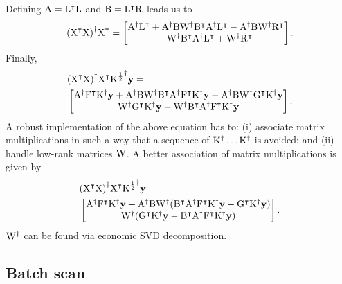 \documentclass[twocolumn,draft]{article}
\begin{document}
	Defining $\mathrm{A} = {\mathrm{L}}^\intercal\mathrm{L}$ and $\mathrm{B} = {\mathrm{L}}^\intercal\mathrm{R}$ leads us to
	\begin{equation*}
			{({\mathrm{X}}^\intercal\mathrm{X})}^{\dagger}{\mathrm{X}}^\intercal =
					\begin{bmatrix}
									{\mathrm{A}}^{\dagger}{\mathrm{L}}^\intercal
												+ {\mathrm{A}}^{\dagger}\mathrm{B}{\mathrm{W}}^{\dagger}{\mathrm{B}}^\intercal{\mathrm{A}}^{\dagger}{\mathrm{L}}^\intercal
															-{\mathrm{A}}^{\dagger}\mathrm{B}{\mathrm{W}}^{\dagger}{\mathrm{R}}^\intercal\\
																		-{\mathrm{W}}^{\dagger}{\mathrm{B}}^\intercal{\mathrm{A}}^{\dagger}{\mathrm{L}}^\intercal
																					+ {\mathrm{W}}^{\dagger}{\mathrm{R}}^\intercal
																							\end{bmatrix}.
	\end{equation*}
	Finally,
	\begin{align*}
			&{({\mathrm{X}}^\intercal\mathrm{X})}^{\dagger}{\mathrm{X}}^\intercal {\mathrm{K}^{\frac{1}{2}}}^{\dagger}\mathbf{y} = \\
				&\begin{bmatrix}
							{\mathrm{A}}^{\dagger}{\mathrm{F}}^\intercal{\mathrm{K}}^{\dagger}\mathbf{y}
									+ {\mathrm{A}}^{\dagger}\mathrm{B}{\mathrm{W}}^{\dagger}{\mathrm{B}}^\intercal{\mathrm{A}}^{\dagger}{\mathrm{F}}^\intercal{\mathrm{K}}^{\dagger}\mathbf{y}
											-{\mathrm{A}}^{\dagger}\mathrm{B}{\mathrm{W}}^{\dagger}{\mathrm{G}}^\intercal{\mathrm{K}}^{\dagger}\mathbf{y} \\
													{\mathrm{W}}^{\dagger}{\mathrm{G}}^\intercal{\mathrm{K}}^{\dagger}\mathbf{y}
															-{\mathrm{W}}^{\dagger}{\mathrm{B}}^\intercal{\mathrm{A}}^{\dagger}{\mathrm{F}}^\intercal{\mathrm{K}}^{\dagger}\mathbf{y}
																\end{bmatrix}.
	\end{align*}
	A robust implementation of the above equation has to:
	(i) associate matrix multiplications in such a way that a sequence of
	${\mathrm{K}}^{\dagger}\dots{\mathrm{K}}^{\dagger}$ is avoided;
	and (ii) handle low-rank matrices $\mathrm{W}$.
	A better association of matrix multiplications is given by
	\begin{align*}
			&{({\mathrm{X}}^\intercal\mathrm{X})}^{\dagger}{\mathrm{X}}^\intercal {\mathrm{K}^{\frac{1}{2}}}^{\dagger}\mathbf{y} = \\
				&\begin{bmatrix}
							{\mathrm{A}}^{\dagger}{\mathrm{F}}^\intercal{\mathrm{K}}^{\dagger}\mathbf{y}
									+ {\mathrm{A}}^{\dagger}\mathrm{B}{\mathrm{W}}^{\dagger}({\mathrm{B}}^\intercal{\mathrm{A}}^{\dagger}{\mathrm{F}}^\intercal{\mathrm{K}}^{\dagger}
											\mathbf{y}-{\mathrm{G}}^\intercal{\mathrm{K}}^{\dagger}\mathbf{y}) \\
													{\mathrm{W}}^{\dagger}({\mathrm{G}}^\intercal{\mathrm{K}}^{\dagger}\mathbf{y}
															-{\mathrm{B}}^\intercal{\mathrm{A}}^{\dagger}{\mathrm{F}}^\intercal{\mathrm{K}}^{\dagger}\mathbf{y})
																\end{bmatrix}.
	\end{align*}
	${\mathrm{W}}^{\dagger}$ can be found via economic SVD decomposition.

	\subsection{Batch scan}
\end{document}
